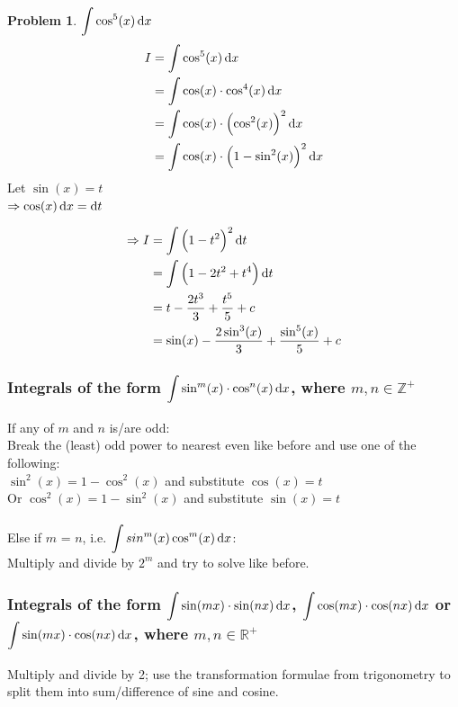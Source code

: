 \documentclass[14]{article}
\theoremstyle{definition}
\newtheorem{prob}{Problem}
\theoremstyle{case}
\begin{document}
\pagebreak
\begin{prob}
$\displaystyle \int \cos^5(x) \dif x$
\begin{align*}
I &= \int \cos^5(x) \dif x\\
&= \int \cos(x) \cdot \cos^4(x) \dif x\\
&= \int \cos(x) \cdot \left(\cos^2(x)\right)^2 \dif x\\
&= \int \cos(x) \cdot \left( 1 - \sin^2(x) \right)^2 \dif x
\end{align*}
Let $\sin(x) = t$\\
$\Rightarrow \cos(x) \dif x = \dif t$
\end{prob}
\begin{align*}
\Rightarrow I &= \int \left( 1 - t^2 \right)^2 \dif t\\
&= \int \left( 1 -2t^2 + t^4 \right) \dif t\\
&= t -\dfrac{2t^3}{3} + \dfrac{t^5}{5} + c\\
&= \sin(x) - \dfrac{2\sin^3(x)}{3} + \dfrac{\sin^5(x)}{5} + c
\end{align*}
\subsubsection*{Integrals of the form $\displaystyle\int \sin^m(x) \cdot \cos^n(x) \dif x$, where $m,n \in \mathbb{Z}^+$}
If any of $m$ and $n$ is/are odd:\\
\indent \indent Break the (least) odd power to nearest even like before and use one of the following:\\
\indent\indent\indent\indent $\sin^2(x) = 1-\cos^2(x)$ and substitute $\cos(x) = t$\\
\indent\indent\indent\indent Or $\cos^2(x) = 1-\sin^2(x)$ and substitute $\sin(x) = t$\\\\
Else if $m$ = $n$, i.e. $\displaystyle \int sin^m(x) \cos^m(x) \dif x$:\\
\indent \indent Multiply and divide by $2^m$ and try to solve like before.
\subsubsection*{Integrals of the form $\displaystyle\int \sin(mx) \cdot \sin(nx) \dif x$, $\displaystyle\int \cos(mx) \cdot \cos(nx) \dif x$ or $\displaystyle\int \sin(mx) \cdot \cos(nx) \dif x$, where $m,n \in \mathbb{R}^+$}
Multiply and divide by 2; use the transformation formulae from trigonometry to split them into sum/difference of sine and cosine.
\pagebreak
\end{document}
